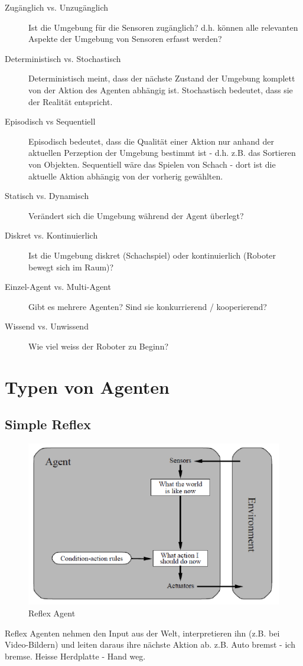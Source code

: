 \begin{description}
	\item[Zugänglich vs. Unzugänglich] Ist die Umgebung für die Sensoren zugänglich? d.h. können alle relevanten Aspekte der Umgebung von Sensoren erfasst werden?
	\item[Deterministisch vs. Stochastisch] Deterministisch meint, dass der nächste Zustand der Umgebung komplett von der Aktion des Agenten abhängig ist. Stochastisch bedeutet, dass sie der Realität entspricht.
	\item[Episodisch vs Sequentiell] Episodisch bedeutet, dass die Qualität einer Aktion nur anhand der aktuellen Perzeption der Umgebung bestimmt ist - d.h. z.B. das Sortieren von Objekten. Sequentiell wäre das Spielen von Schach - dort ist die aktuelle Aktion abhängig von der vorherig gewählten.
	\item[Statisch vs. Dynamisch] Verändert sich die Umgebung während der Agent überlegt?
	\item[Diskret vs. Kontinuierlich] Ist die Umgebung diskret (Schachspiel) oder kontinuierlich (Roboter bewegt sich im Raum)?
	\item[Einzel-Agent vs. Multi-Agent] Gibt es mehrere Agenten? Sind sie konkurrierend / kooperierend?
	\item[Wissend vs. Unwissend] Wie viel weiss der Roboter zu Beginn?
\end{description}

\section{Typen von Agenten}
\subsection{Simple Reflex}
\begin{figure}[h]
\centering
\includegraphics[width=0.7\linewidth]{fig/reflex_agent}
\caption{Reflex Agent}
\label{fig:reflex_agent}
\end{figure}
Reflex Agenten nehmen den Input aus der Welt, interpretieren ihn (z.B. bei Video-Bildern) und leiten daraus ihre nächste Aktion ab. z.B. Auto bremst - ich bremse. Heisse Herdplatte - Hand weg.

